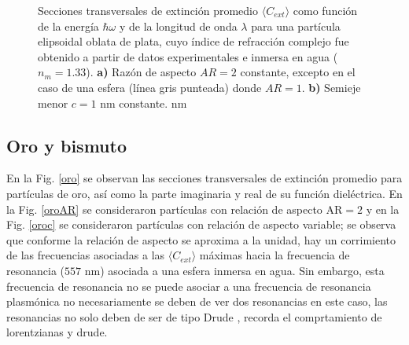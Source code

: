 \begin{figure}[h!]
	\quad%
	\caption{Secciones transversales de extinción promedio $\langle C_{ext}\rangle$ como función de la energía $\hbar\omega$ y de la longitud de onda $\lambda$ para una partícula elipsoidal oblata de plata, cuyo índice de refracción complejo fue obtenido a partir de datos experimentales  e inmersa en agua ($n_m=1.33$). \textbf{a)} Razón de aspecto $AR=2$ constante, excepto en el caso de una esfera (línea gris punteada) donde $AR=1$. \textbf{b)} Semieje menor $c=1$ nm constante. nm}\label{plata}
\end{figure}

\subsection*{Oro y bismuto}
En la Fig. \ref{oro} se observan las secciones transversales de extinción promedio para partículas de oro, así como la parte imaginaria y real de su función dieléctrica. En la Fig. \ref{oroAR} se consideraron partículas con relación de aspecto AR$=2$ y en la Fig. \ref{oroc} se consideraron partículas con relación de aspecto variable; se observa que conforme la relación de aspecto se aproxima a la unidad, hay un corrimiento de las frecuencias asociadas a las $\langle C_{ext}\rangle$ máximas hacia la frecuencia de resonancia ($557\text{ nm}$) asociada a una esfera  inmersa en agua. Sin embargo, esta frecuencia de resonancia no se puede asociar a una frecuencia de resonancia plasmónica
no necesariamente se deben de ver dos resonancias en este caso, las resonancias no solo deben de ser de tipo Drude  , recorda el comprtamiento de lorentzianas y drude.


